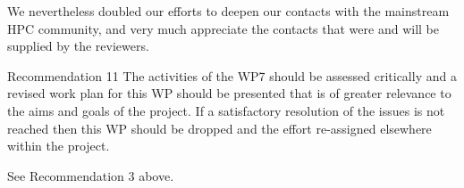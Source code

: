 

We nevertheless doubled our efforts to deepen our contacts with the
mainstream HPC community, and very much appreciate the contacts that
were and will be supplied by the reviewers.


\begin{recommendation}{Recommendation 11}
  The activities of the WP7 should be assessed critically and a
  revised work plan for this WP should be presented that is of greater
  relevance to the aims and goals of the project. If a satisfactory
  resolution of the issues is not reached then this WP should be
  dropped and the effort re-assigned elsewhere within the project.
\end{recommendation}

See Recommendation 3 above.


